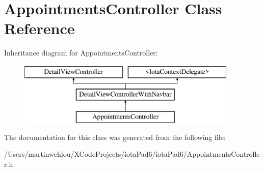 \hypertarget{interface_appointments_controller}{
\section{AppointmentsController Class Reference}
\label{interface_appointments_controller}
}
Inheritance diagram for AppointmentsController:\begin{figure}[H]
\begin{center}
\leavevmode
\includegraphics[height=3.000000cm]{interface_appointments_controller}
\end{center}
\end{figure}


The documentation for this class was generated from the following file:\begin{DoxyCompactItemize}
\item 
/Users/martinwehlou/XCodeProjects/iotaPad6/iotaPad6/AppointmentsController.h\end{DoxyCompactItemize}
